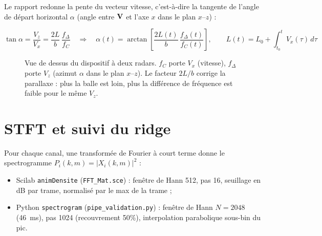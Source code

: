 \documentclass[10pt,a4paper]{report}
\begin{document}
Le rapport redonne la pente du vecteur vitesse, c'est-à-dire la tangente de l'angle de départ horizontal $\alpha$ (angle entre $\vb V$ et l'axe $x$ dans le plan $x$--$z$) :

\begin{equation}
\boxed{\tan\alpha = \frac{V_z}{V_x} = \frac{2L}{b}\,\frac{f_\Delta}{f_C}
\quad\Longrightarrow\quad
\alpha(t) = \arctan\!\left[\frac{2L(t)}{b}\,\frac{f_\Delta(t)}{f_C(t)}\right], \qquad
L(t) = L_0 + \int_{t_0}^{t} V_x(\tau)\,d\tau }
\end{equation}

\begin{figure}[H]\centering
{}
\caption{Vue de dessus du dispositif à deux radars. $f_C$ porte $V_x$ (vitesse), $f_\Delta$ porte $V_z$ (azimut $\alpha$ dans le plan $x$--$z$). Le facteur $2L/b$ corrige la parallaxe : plus la balle est loin, plus la différence de fréquence est faible pour le même $V_z$.}
\label{fig:geom2radars}
\end{figure}

\section{STFT et suivi du ridge}

Pour chaque canal, une transformée de Fourier à court terme donne le spectrogramme $P_i(k,m)=|X_i(k,m)|^2$ :
\begin{itemize}
  \item Scilab \texttt{animDensite} (\texttt{FFT\_Mat.sce}) : fenêtre de Hann 512, pas 16, seuillage en dB par trame, normalisé par le max de la trame ;
  \item Python \texttt{spectrogram} (\texttt{pipe\_validation.py}) : fenêtre de Hann $N=2048$ (46~ms), pas 1024 (recouvrement 50\%), interpolation parabolique sous-bin du pic.
\end{itemize}
\end{document}
